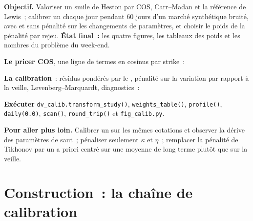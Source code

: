 \begin{tutorial}
\textbf{Objectif.} Valoriser un smile de Heston par COS, Carr--Madan et la référence de Lewis~; calibrer un  chaque jour pendant 60 jours d'un marché synthétique bruité,
avec et sans pénalité sur les changements de paramètres, et choisir le poids de la pénalité par rejeu. \textbf{État final~:} les quatre figures,
les tableaux des poids et les nombres du problème du week-end.
\begin{tutsteps}
\item \textbf{Le pricer COS}, une ligne de termes en cosinus par strike~:
\label{lst:dv:fourier-pricing-and-calibration-engineering:cos}
\item \textbf{La calibration}~: résidus pondérés par le , pénalité sur la variation par rapport à la veille, Levenberg--Marquardt, diagnostics~:
\label{lst:dv:fourier-pricing-and-calibration-engineering:calib}
\item \textbf{Exécuter} \texttt{dv\_calib.transform\_study()}, \texttt{weights\_table()}, \texttt{profile()}, \texttt{daily(0.0)}, \texttt{scan()},
\texttt{round\_trip()} et \texttt{fig\_calib.py}.
\end{tutsteps}
\textbf{Pour aller plus loin.} Calibrer un  sur les mêmes cotations et observer la dérive des paramètres de saut~; pénaliser seulement $\kappa$ et $\eta$~;
remplacer la pénalité de Tikhonov par un a priori centré sur une moyenne de long terme plutôt que sur la veille.
\end{tutorial}

\section{Construction~: la chaîne de calibration}\label{bld:dv:fourier-pricing-and-calibration-engineering:calib}

